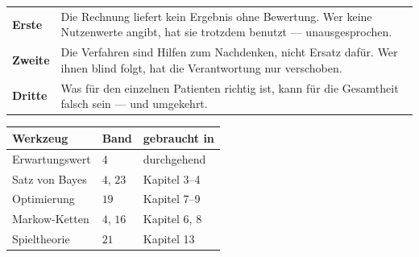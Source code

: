 \begin{warnung}
\begin{center}
{\small
\renewcommand{\arraystretch}{1.55}
\begin{tabular}{@{}P{2.2cm}P{6.4cm}@{}}
\toprule
\textbf{Erste} & Die Rechnung liefert kein Ergebnis ohne Bewertung. Wer keine Nutzenwerte angibt, hat sie trotzdem benutzt --- unausgesprochen.\\
\textbf{Zweite} & Die Verfahren sind Hilfen zum Nachdenken, nicht Ersatz dafür. Wer ihnen blind folgt, hat die Verantwortung nur verschoben.\\
\textbf{Dritte} & Was für den einzelnen Patienten richtig ist, kann für die Gesamtheit falsch sein --- und umgekehrt.\\
\bottomrule
\end{tabular}}
\end{center}

\begin{center}
\begin{minipage}{0.88\textwidth}
\end{minipage}
\end{center}
\end{warnung}

\begin{merksatz}
\begin{center}
{\small
\renewcommand{\arraystretch}{1.48}
\begin{tabular}{@{}P{3.0cm}P{1.6cm}P{3.0cm}@{}}
\toprule
\textbf{Werkzeug} & \textbf{Band} & \textbf{gebraucht in}\\
\midrule
Erwartungswert & $4$ & durchgehend\\
Satz von Bayes & $4$, $23$ & Kapitel 3--4\\
Optimierung & $19$ & Kapitel 7--9\\
Markow-Ketten & $4$, $16$ & Kapitel 6, 8\\
Spieltheorie & $21$ & Kapitel 13\\
\bottomrule
\end{tabular}}
\end{center}

\begin{center}
\begin{minipage}{0.88\textwidth}
\end{minipage}
\end{center}
\end{merksatz}
